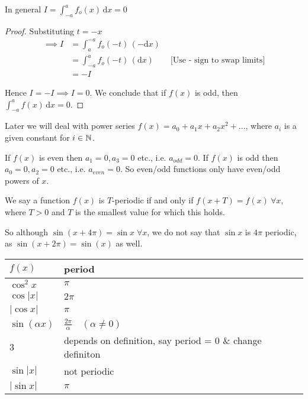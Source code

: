 \documentclass[twoside]{scrartcl}
\begin{document}
\begin{proposition} In general $I = \displaystyle{\boxed{\int_{-a}^{a} f_o(x) \, \mathrm{d}x = 0}}$\end{proposition}
\begin{proof}Substituting $t = -x$
\begin{align*}\nonumber
 \implies I &= \int_{a}^{-a} f_o(-t) \, (\mathrm{-d}x) \\
 &=  \int_{-a}^{a} f_o(-t) \, (\mathrm{d}x) \qquad \text{[Use - sign to swap limits]}\\
 &=  -I 
\end{align*}

Hence $I = -I \implies I = 0$. We conclude that if $f(x)$ is odd, then $ \displaystyle{\int_{-a}^{a} f(x) \, \mathrm{d}x = 0}.$\end{proof}

Later we will deal with power series $f(x) = a_0 + a_1x + a_2x^2 + ...$, where $a_i$ is a given constant  for $i \in \mathbb{N}$. 

If $f(x)$ is even then $a_1 = 0, a_3 = 0$ etc., i.e. $a_{odd} = 0$. If $f(x)$ is odd then $a_0 = 0, a_2 = 0$ etc., i.e. $a_{even} = 0$. So even/odd functions only have even/odd powers of $x$.\\


\vspace*{5pt}
\begin{definition} 
We say a function $f(x)$ is $T$-periodic if and only if $f(x + T) = f(x)~ \forall x$, where $T >0 $ and $T$ is the smallest value for which this holds.
\end{definition}


So although $\sin (x+ 4\pi) = \sin x \; \forall x$, we do not say that $\sin x$ is $4\pi$ periodic, as $\sin (x + 2\pi) = \sin (x) $ as well.\\

\bgroup
\def\arraystretch{1.5}
\begin{table}[H]
    \begin{tabular}{l|l}
    \hline
    $f(x)$            & period                                                    \\ \hline
    $\cos^2x$         & $\pi$                                                     \\
    $\cos |x|$        & $2\pi$                                                    \\
    $|\cos x|$        & $\pi$                                                     \\
    $\sin (\alpha x)$ & $\frac{2\pi}{\alpha} \quad (\alpha \neq 0)$               \\
    $3$                 & depends on definition, say period = 0 \& change definiton \\
    $\sin |x|$        & not periodic                                              \\
    $| \sin x|$       & $\pi$                                                     \\
    \end{tabular}
\end{table}
\egroup
\end{document}
